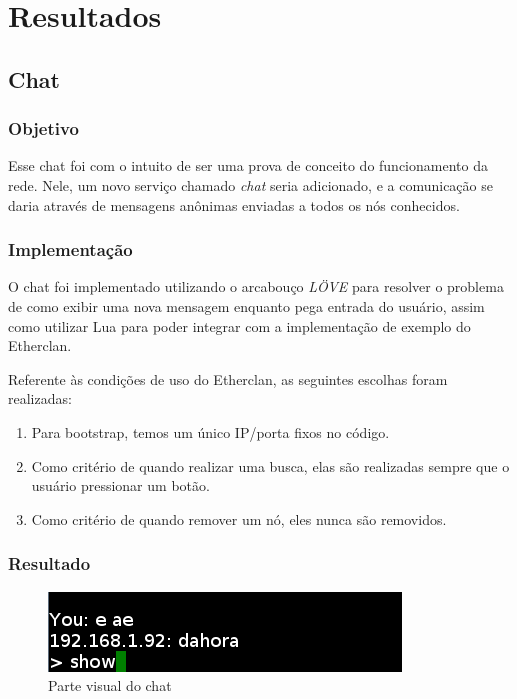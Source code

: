 \chapter{Resultados}
\label{sec:resultados}

\section{Chat}
\label{sec:resultados:chat}

  \subsection{Objetivo}
    Esse chat foi com o intuito de ser uma prova de conceito do funcionamento da rede.
    Nele, um novo serviço chamado \textit{chat} seria adicionado, e a comunicação se daria
    através de mensagens anônimas enviadas a todos os nós conhecidos.
    
  \subsection{Implementação}
    O chat foi implementado utilizando o arcabouço \textit{LÖVE} para resolver o problema
    de como exibir uma nova mensagem enquanto pega entrada do usuário, assim como utilizar
    Lua para poder integrar com a implementação de exemplo do Etherclan.
    
    Referente às condições de uso do Etherclan, as seguintes escolhas foram realizadas:
    \begin{enumerate}
      \item Para bootstrap, temos um único IP/porta fixos no código.
      \item Como critério de quando realizar uma busca, elas são realizadas sempre que o
        usuário pressionar um botão.
      \item Como critério de quando remover um nó, eles nunca são removidos.
    \end{enumerate}
    
  \subsection{Resultado}
    \begin{figure}[h]
      \centering
      \includegraphics{../slides/chat.png}
      \caption{Parte visual do chat}
    \end{figure}
    
